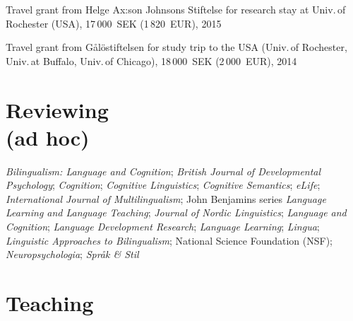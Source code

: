 \documentclass[margin, 11pt]{res} %
\begin{document}
\begin{resume}
Travel grant from Helge Ax:son Johnsons Stiftelse for research stay at Univ.\,of Rochester (USA), 17\,000~SEK (1\,820~EUR), 2015

Travel grant from G\aa l\"{o}stiftelsen for study trip to the USA (Univ.\,of Rochester, Univ.\,at Buffalo, Univ.\,of Chicago), 18\,000~SEK (2\,000~EUR), 2014
 











\section{\sc Reviewing\\(ad hoc)}

\textit{Bilingualism: Language and Cognition};
\textit{British Journal of Developmental Psychology};
\textit{Cognition};
\textit{Cognitive Linguistics};
\textit{Cognitive Semantics};
\textit{eLife};
\textit{International Journal of Multilingualism};
John Benjamins series \textit{Language Learning and Language Teaching};
\textit{Journal of Nordic Linguistics};
\textit{Language and Cognition};
\textit{Language Development Research};
\textit{Language Learning};
\textit{Lingua};
\textit{Linguistic Approaches to Bilingualism};
National Science Foundation (NSF);
\textit{Neuropsychologia};
\textit{Spr\r{a}k \& Stil}






\section{\sc Teaching}


\end{resume}
\end{document}
